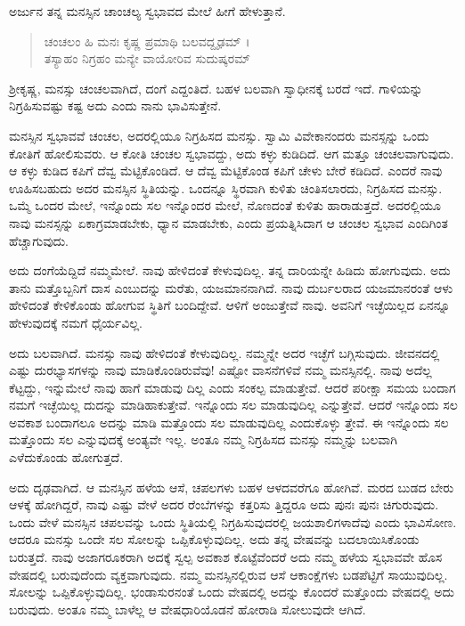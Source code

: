 ಅರ್ಜುನ ತನ್ನ ಮನಸ್ಸಿನ ಚಾಂಚಲ್ಯ ಸ್ವಭಾವದ ಮೇಲೆ ಹೀಗೆ ಹೇಳುತ್ತಾನೆ.

\begin{verse}
ಚಂಚಲಂ ಹಿ ಮನಃ ಕೃಷ್ಣ ಪ್ರಮಾಥಿ ಬಲವದ್ದೃಢಮ್ ।\\ತಸ್ಯಾಹಂ ನಿಗ್ರಹಂ ಮನ್ಯೇ ವಾಯೋರಿವ ಸುದುಷ್ಕರಮ್ 
\end{verse}

{\small ಶ್ರೀಕೃಷ್ಣ, ಮನಸ್ಸು ಚಂಚಲವಾಗಿದೆ, ದಂಗೆ ಎದ್ದಂತಿದೆ. ಬಹಳ ಬಲವಾಗಿ ಸ್ವಾಧೀನಕ್ಕೆ ಬರದೆ ಇದೆ. ಗಾಳಿಯನ್ನು ನಿಗ್ರಹಿಸುವಷ್ಟು ಕಷ್ಟ ಅದು ಎಂದು ನಾನು ಭಾವಿಸುತ್ತೇನೆ.}

ಮನಸ್ಸಿನ ಸ್ವಭಾವವೆ ಚಂಚಲ, ಅದರಲ್ಲಿಯೂ ನಿಗ್ರಹಿಸದ ಮನಸ್ಸು. ಸ್ವಾಮಿ ವಿವೇಕಾನಂದರು ಮನಸ್ಸನ್ನು ಒಂದು ಕೋತಿಗೆ ಹೋಲಿಸುವರು. ಆ ಕೋತಿ ಚಂಚಲ ಸ್ವಭಾವದ್ದು, ಅದು ಕಳ್ಳು ಕುಡಿದಿದೆ. ಆಗ ಮತ್ತೂ ಚಂಚಲವಾಗುವುದು. ಆ ಕಳ್ಳು ಕುಡಿದ ಕಪಿಗೆ ದೆವ್ವ ಮೆಟ್ಟಿಕೊಂಡಿದೆ. ಆ ದೆವ್ವ ಮೆಟ್ಟಿಕೊಂಡ ಕಪಿಗೆ ಚೇಳು ಬೇರೆ ಕಡಿದಿದೆ. ಎಂದರೆ ನಾವು ಊಹಿಸಬಹುದು ಅದರ ಮನಸ್ಸಿನ ಸ್ಥಿತಿಯನ್ನು. ಒಂದನ್ನೂ ಸ್ಥಿರವಾಗಿ ಕುಳಿತು ಚಿಂತಿಸಲಾರದು, ನಿಗ್ರಹಿಸದ ಮನಸ್ಸು. ಒಮ್ಮೆ ಒಂದರ ಮೇಲೆ, ಇನ್ನೊಂದು ಸಲ ಇನ್ನೊಂದರ ಮೇಲೆ, ನೊಣದಂತೆ ಕುಳಿತು ಹಾರಾಡುತ್ತದೆ. ಅದರಲ್ಲಿಯೂ ನಾವು ಮನಸ್ಸನ್ನು ಏಕಾಗ್ರಮಾಡಬೇಕು, ಧ್ಯಾನ ಮಾಡಬೇಕು, ಎಂದು ಪ್ರಯತ್ನಿಸಿದಾಗ ಆ ಚಂಚಲ ಸ್ವಭಾವ ಎಂದಿಗಿಂತ ಹೆಚ್ಚಾಗುವುದು.

ಅದು ದಂಗೆಯೆದ್ದಿದೆ ನಮ್ಮಮೇಲೆ. ನಾವು ಹೇಳಿದಂತೆ ಕೇಳುವುದಿಲ್ಲ. ತನ್ನ ದಾರಿಯನ್ನೇ ಹಿಡಿದು ಹೋಗುವುದು. ಅದು ತಾನು ಮತ್ತೊಬ್ಬನಿಗೆ ದಾಸ ಎಂಬುದನ್ನು ಮರೆತು, ಯಜಮಾನನಾಗಿದೆ. ನಾವು ದುರ್ಬಲರಾದ ಯಜಮಾನರಂತೆ ಆಳು ಹೇಳಿದಂತೆ ಕೇಳಿಕೊಂಡು ಹೋಗುವ ಸ್ಥಿತಿಗೆ ಬಂದಿದ್ದೇವೆ. ಆಳಿಗೆ ಅಂಜುತ್ತೇವೆ ನಾವು. ಅವನಿಗೆ ಇಚ್ಛೆಯಿಲ್ಲದ ಏನನ್ನೂ ಹೇಳುವುದಕ್ಕೆ ನಮಗೆ ಧೈರ್ಯವಿಲ್ಲ.

ಅದು ಬಲವಾಗಿದೆ. ಮನಸ್ಸು ನಾವು ಹೇಳಿದಂತೆ ಕೇಳುವುದಿಲ್ಲ. ನಮ್ಮನ್ನೇ ಅದರ ಇಚ್ಛೆಗೆ ಬಗ್ಗಿಸುವುದು. ಜೀವನದಲ್ಲಿ ಎಷ್ಟು ದುರಭ್ಯಾಸಗಳನ್ನು ನಾವು ಮಾಡಿಕೊಂಡಿರುವೆವು! ಎಷ್ಟೋ ವಾಸನೆಗಳಿವೆ ನಮ್ಮ ಮನಸ್ಸಿನಲ್ಲಿ. ನಾವು ಅದೆಲ್ಲ ಕೆಟ್ಟದ್ದು, ಇನ್ನುಮೇಲೆ ನಾವು ಹಾಗೆ ಮಾಡುವು ದಿಲ್ಲ ಎಂದು ಸಂಕಲ್ಪ ಮಾಡುತ್ತೇವೆ. ಆದರೆ ಪರೀಕ್ಷಾ ಸಮಯ ಬಂದಾಗ ನಮಗೆ ಇಚ್ಛೆಯಿಲ್ಲ ದುದನ್ನು ಮಾಡಿಹಾಕುತ್ತೇವೆ. ಇನ್ನೊಂದು ಸಲ ಮಾಡುವುದಿಲ್ಲ ಎನ್ನುತ್ತೇವೆ. ಆದರೆ ಇನ್ನೊಂದು ಸಲ ಅವಕಾಶ ಬಂದಾಗಲೂ ಅದನ್ನು ಮಾಡಿ ಮತ್ತೊಂದು ಸಲ ಮಾಡುವುದಿಲ್ಲ ಎಂದುಕೊಳ್ಳು ತ್ತೇವೆ. ಈ ಇನ್ನೊಂದು ಸಲ ಮತ್ತೊಂದು ಸಲ ಎನ್ನುವುದಕ್ಕೆ ಅಂತ್ಯವೇ ಇಲ್ಲ. ಅಂತೂ ನಮ್ಮ ನಿಗ್ರಹಿಸದ ಮನಸ್ಸು ನಮ್ಮನ್ನು ಬಲವಾಗಿ ಎಳೆದುಕೊಂಡು ಹೋಗುತ್ತದೆ.

ಅದು ದೃಢವಾಗಿದೆ. ಆ ಮನಸ್ಸಿನ ಹಳೆಯ ಆಸೆ, ಚಪಲಗಳು ಬಹಳ ಆಳದವರೆಗೂ ಹೋಗಿವೆ. ಮರದ ಬುಡದ ಬೇರು ಆಳಕ್ಕೆ ಹೋಗಿದ್ದರೆ, ನಾವು ಎಷ್ಟು ವೇಳೆ ಅದರ ರೆಂಬೆಗಳನ್ನು ಕತ್ತರಿಸು ತ್ತಿದ್ದರೂ ಅದು ಪುನಃ ಪುನಃ ಚಿಗುರುವುದು. ಒಂದು ವೇಳೆ ಮನಸ್ಸಿನ ಚಪಲವನ್ನು ಒಂದು ಸ್ಥಿತಿಯಲ್ಲಿ ನಿಗ್ರಹಿಸುವುದರಲ್ಲಿ ಜಯಶಾಲಿಗಳಾದೆವು ಎಂದು ಭಾವಿಸೋಣ. ಆದರೂ ಮನಸ್ಸು ಒಂದೇ ಸಲ ಸೋಲನ್ನು ಒಪ್ಪಿಕೊಳ್ಳುವುದಿಲ್ಲ. ಅದು ತನ್ನ ವೇಷವನ್ನು ಬದಲಾಯಿಸಿಕೊಂಡು ಬರುತ್ತದೆ. ನಾವು ಅಜಾಗರೂಕರಾಗಿ ಅದಕ್ಕೆ ಸ್ವಲ್ಪ ಅವಕಾಶ ಕೊಟ್ಟೆವೆಂದರೆ ಅದು ನಮ್ಮ ಹಳೆಯ ಸ್ವಭಾವವೇ ಹೊಸ ವೇಷದಲ್ಲಿ ಬರುವುದೆಂದು ವ್ಯಕ್ತವಾಗುವುದು. ನಮ್ಮ ಮನಸ್ಸಿನಲ್ಲಿರುವ ಆಸೆ ಆಕಾಂಕ್ಷೆಗಳು ಬಡಪೆಟ್ಟಿಗೆ ಸಾಯುವುದಿಲ್ಲ. ಸೋಲನ್ನು ಒಪ್ಪಿಕೊಳ್ಳುವುದಿಲ್ಲ. ಭಂಡಾಸುರನಂತೆ ಒಂದು ವೇಷದಲ್ಲಿ ಅದನ್ನು ಕೊಂದರೆ ಮತ್ತೊಂದು ವೇಷದಲ್ಲಿ ಅದು ಬರುವುದು. ಅಂತೂ ನಮ್ಮ ಬಾಳೆಲ್ಲ ಆ ವೇಷಧಾರಿಯೊಡನೆ ಹೋರಾಡಿ ಸೋಲುವುದೇ ಆಗಿದೆ.


